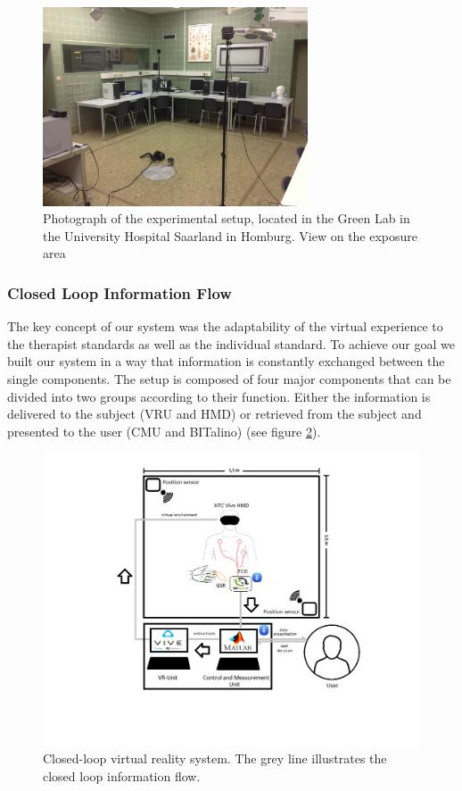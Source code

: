 \begin{figure}[H]
\centering
\includegraphics[width=0.7\textwidth]{images/IMG_5310.JPG}
\caption{Photograph of the experimental setup, located in the Green Lab in the University Hospital Saarland in Homburg. View on the exposure area}
\label{SetupVR2Img}
\end{figure}

\subsubsection{Closed Loop Information Flow}
The key concept of our system was the adaptability of the virtual experience to the therapist standards as well as the individual standard. To achieve our goal we built our system in a way that information is constantly exchanged between the single components.
The setup is composed of four major components that can be divided into two groups according to their function. Either the information is delivered to the subject (VRU and HMD) or retrieved from the subject and presented to the user (CMU and BITalino) (see figure \ref{setupImg}).\\ 

\begin{figure}[H]
\centering
\includegraphics[width=1\textwidth]{images/setup.png}
\caption{Closed-loop virtual reality system. The grey line illustrates the closed loop information flow.}
\label{setupImg}
\end{figure}

